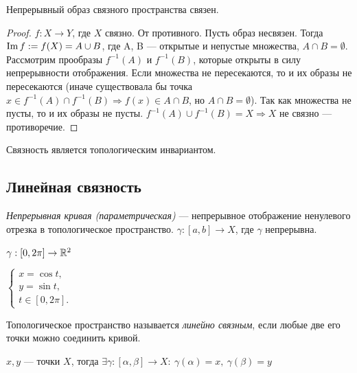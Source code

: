 \begin{statement}
    Непрерывный образ связного пространства связен.
\end{statement}
\begin{proof}
    $f: X \to Y$, где $X$ связно. От противного. Пусть образ несвязен. Тогда $\operatorname*{Im} f := f(X) = A \cup B$, где A, B — открытые и непустые множества, $A \cap B = \emptyset$. Рассмотрим прообразы $f^{-1}(A)$ и $f^{-1}(B)$, которые открыты в силу непрерывности отображения. Если множества не пересекаются, то и их образы не пересекаются (иначе существовала бы точка $x \in f^{-1}(A) \cap f^{-1}(B) \Longrightarrow f(x) \in A \cap B$, но $A \cap B = \emptyset$). Так как множества не пусты, то и их образы не пусты. $f^{-1}(A) \cup f^{-1}(B) = X \Longrightarrow X$ не связно — противоречие. 
\end{proof}

\begin{remark}
    Связность является топологическим инвариантом.
\end{remark}


\subsection{Линейная связность}
\begin{definition}
    \textit{Непрерывная кривая (параметрическая)} — непрерывное отображение ненулевого отрезка в топологическое пространство. $\gamma: [a,b] \to X$, где $\gamma$ непрерывна.
\end{definition}

\begin{example}
   $\gamma: [0, 2 \pi] \to \mathbb{R}^{2}$

    $\begin{cases}
        x = \cos{t}, \\
        y = \sin{t}, \\
        t \in [0, 2 \pi].
    \end{cases}$ 
\end{example}


\begin{definition}
    Топологическое пространство называется \textit{линейно связным}, если любые две его точки можно соединить кривой.
\end{definition}

\begin{example}
    $x, y$ — точки $X$, тогда $\exists \gamma: [\alpha, \beta] \to X: \ \gamma(\alpha) = x, \ \gamma(\beta) = y$
\end{example}

